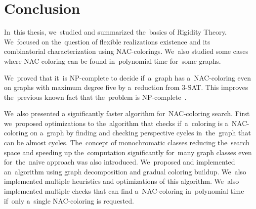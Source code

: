 
\chapter*{Conclusion}



In~this thesis,
we~studied and summarized the~basics of Rigidity Theory.
We~focused on the~question of flexible realizations existence
and its combinatorial characterization using NAC-colorings.
We~also studied some cases where NAC-coloring can be found in~polynomial time
for~some graphs.

We~proved that it~is NP-complete
to decide if~a~graph has a~NAC-coloring even on graphs with maximum degree five
by a~reduction from 3-SAT\@.
This improves the~previous known fact that the~problem is NP-complete~\cite{np_complete}.

We~also presented a significantly faster algorithm
for~NAC-coloring search.
%
First we~proposed optimizations to the~algorithm
that checks if~a~coloring is a~NAC-coloring on a~graph
by finding and checking perspective cycles in~the~graph
that can be almost cycles.
%
The~concept of monochromatic classes reducing the~search space
and speeding up the~computation significantly for~many graph classes
even for~the~naive approach was also introduced.
%
We~proposed and implemented an~algorithm using graph decomposition and gradual coloring buildup.
We~also implemented multiple heuristics and optimizations of this algorithm.
%
We~also implemented multiple checks that can find a~NAC-coloring in~polynomial time
if~only a~single NAC-coloring is requested.

